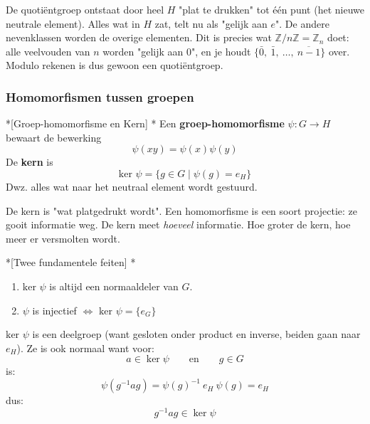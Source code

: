 \textbf{} De quotiëntgroep ontstaat door heel $H$ "plat te drukken" tot één punt (het nieuwe neutrale element). Alles wat in $H$ zat, telt nu als "gelijk aan $e$". De andere nevenklassen worden de overige elementen. Dit is precies wat $\mathbb{Z}/n\mathbb{Z} = \mathbb{Z}_n$ doet: alle veelvouden van $n$ worden "gelijk aan 0", en je houdt $\{\bar{0},\ \bar{1},\ \ldots,\ \overline{n-1}\}$ over. Modulo rekenen is dus gewoon een quotiëntgroep. 

\subsubsection{Homomorfismen tussen groepen}

\begin{nicedefinition}*[Groep-homomorfisme en Kern]
    \nextpart[]*
    Een \textcolor{PineGreen!75!black}{\textbf{groep-homomorfisme}} $\psi:G\to H$ bewaart de bewerking
    \begin{equation*}
        \psi(xy) = \psi(x)\psi(y)
    \end{equation*}
    De \textcolor{PineGreen!75!black}{\textbf{kern}} is
    \begin{equation*}
        \text{ker }\psi = \{g \in G \mid \psi(g) = e_H\}
    \end{equation*}
    Dwz. alles wat naar het neutraal element wordt gestuurd.
\end{nicedefinition}

\textbf{} De kern is "wat platgedrukt wordt". Een homomorfisme is een soort projectie: ze gooit informatie weg. De kern meet \emph{hoeveel} informatie. Hoe groter de kern, hoe meer er versmolten wordt.

\newpage
\begin{nicetheorem}*[Twee fundamentele feiten]
    \nextpart[]*
    \begin{enumerate}
        \item $\text{ker }\psi$ is altijd een normaaldeler van $G$.
        \item $\psi$ is injectief $\iff$ $\text{ker }\psi = \{e_G\}$
    \end{enumerate}
\end{nicetheorem}

\textbf{} $\text{ker }\psi$ is een deelgroep (want gesloten onder product en inverse, beiden gaan naar $e_H$). Ze is ook normaal want voor:
\begin{equation*}
    a \in \operatorname{ker}\psi \qquad \text{en} \qquad g \in G
\end{equation*}
is:
\begin{equation*}
    \psi(g^{-1}ag) = \psi(g)^{-1}\ e_H\ \psi(g) = e_H
\end{equation*}
dus:
\begin{equation*}
    g^{-1}ag \in \operatorname{ker}\psi
\end{equation*}

